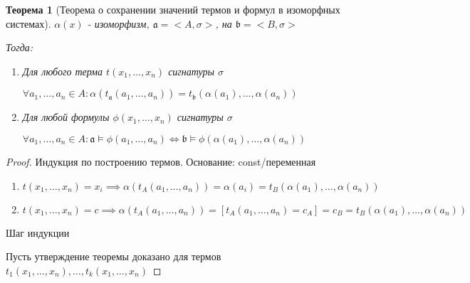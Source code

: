 \documentclass[a4paper]{article}
\newtheorem{theorem}{Теорема}[section]
\theoremstyle{definition}
\theoremstyle{remark}
\begin{document}
    \begin{theorem}[Теорема о сохранении значений термов и формул в изоморфных системах]
        $\alpha(x)$ - изоморфизм, $\mathfrak{a} = <A, \sigma>$, на $\mathfrak{b} = <B, \sigma>$

        Тогда:
        \begin{enumerate}
            \item Для любого терма $t(x_1, \dots, x_n)$ сигнатуры $\sigma$
            
            $\forall a_1, \dots, a_n \in A: \alpha (t_\mathfrak{a}(a_1, \dots, a_n))= t_\mathfrak{b}(\alpha(a_1), \dots, \alpha(a_n))$

            \item Для любой формулы $\phi(x_1, \dots, x_n)$ сигнатуры $\sigma$
            
            $\forall a_1, \dots, a_n \in A: \mathfrak{a}\models \phi(a_1, \dots, a_n)\Leftrightarrow \mathfrak{b} \models \phi(\alpha(a_1), \dots, \alpha(a_n))$
        \end{enumerate}
    \end{theorem}
    \begin{proof}
        Индукция по построению термов. Основание: const/переменная

        \begin{enumerate}
            \item $t(x_1, \dots, x_n) = x_i\implies \alpha (t_A(a_1, \dots, a_n)) = \alpha(a_i) = t_B (\alpha(a_1), \dots, \alpha(a_n))$
            \item $t(x_1, \dots, x_n) = c \implies \alpha(t_A(a_1, \dots, a_n))= [t_A(a_1, \dots, a_n) = c_A] = c_B = t_B(\alpha(a_1), \dots, \alpha(a_n))$
        \end{enumerate}

        Шаг индукции

        Пусть утверждение теоремы доказано для термов $t_1(x_1, \dots, x_n), \dots, t_k (x_1, \dots, x_n)$
    \end{proof}
\end{document}
